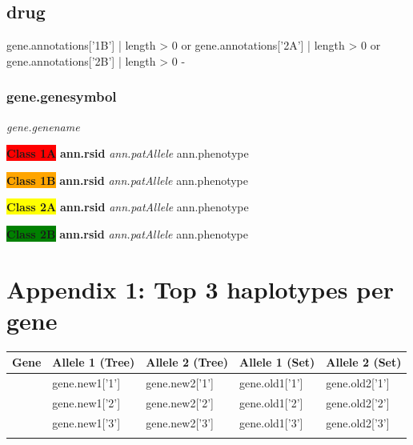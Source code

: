 \documentclass{report}
\begin{document}
{{{{{{{{{{{{\subsection{ {{drug}} }

{%
 gene.annotations['1B'] | length > 0 or
  gene.annotations['2A'] | length > 0  or
   gene.annotations['2B'] | length > 0 -%

\subsubsection{ {{gene.genesymbol}} }
\textit{ {{gene.genename}} } \newline

{%
\textbf{\colorbox{red} {Class 1A}} \textbf{ {{ann.rsid}} } \textit{ {{ann.patAllele}} }
{{ann.phenotype}}\newline
{%
{%
\textbf{\colorbox{orange} {Class 1B}} \textbf{ {{ann.rsid}} } \textit{ {{ann.patAllele}} }
{{ann.phenotype}}\newline
{%
{%
\textbf{\colorbox{yellow} {Class 2A}} \textbf{ {{ann.rsid}} } \textit{ {{ann.patAllele}} }
{{ann.phenotype}}\newline
{%
{%
\textbf{\colorbox{green} {Class 2B}} \textbf{ {{ann.rsid}} } \textit{ {{ann.patAllele}} }
{{ann.phenotype}}\newline
{%

{%

{%

{%

\newpage

\section{Appendix 1: Top 3 haplotypes per gene}
\scriptsize

\begin{tabularx}{\textwidth}{ X | XXXX }
\toprule
\textbf{Gene} & \textbf{Allele 1 (Tree) } & \textbf{Allele 2 (Tree)} & \textbf{Allele 1 (Set) } & \textbf{Allele 2 (Set)} \\
\midrule
{%
{{gene.symbol}}
& {{gene.new1['1']}} & {{gene.new2['1']}} & {{gene.old1['1']}} & {{gene.old2['1']}} \\
& {{gene.new1['2']}} & {{gene.new2['2']}} & {{gene.old1['2']}} & {{gene.old2['2']}}  \\
& {{gene.new1['3']}} & {{gene.new2['3']}} & {{gene.old1['3']}} & {{gene.old2['3']}} \\
{%
\bottomrule
\end{tabularx}
\normalsize
\newpage

}}}}}}}}}}}}}}}}}}}}}}}}
\end{document}

